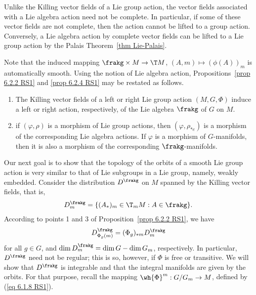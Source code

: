 Unlike the Killing vector fields of a Lie group action, the vector fields associated with a Lie algebra action need not be complete. In particular, if some of these vector fields are not complete, then the action cannot be lifted to a group action. Conversely, a Lie algebra action by complete vector fields can be lifted to a Lie group action by the Palais Theorem~\ref{thm Lie-Palais}.

Note that the induced mapping $\frakg\times M\to \T M$, $(A,m)\mapsto (\phi(A))_m$ is automatically smooth. Using the notion of Lie algebra action, Propositions~\ref{prop 6.2.2 RS1} and \ref{prop 6.2.4 RS1} may be restated as follows.

\begin{cor}[{{\cite[Cor.~6.2.7]{RS1}}}]
    \begin{enumerate}
        \item The Killing vector fields of a left or right Lie group action $(M,G,\Phi)$ induce a left or right action, respectively, of the Lie algebra $\frakg$ of $G$ on $M$.
        \item if $(\varphi,\rho)$ is a morphism of Lie group actions, then $(\varphi,\rho_{\ast e})$ is a morphism of the corresponding Lie algebra actions. If $\varphi$ is a morphism of $G$-manifolds, then it is also a morphism of the corresponding $\frakg$-manifolds.
    \end{enumerate}
\end{cor}

Our next goal is to show that the topology of the orbits of a smooth Lie group action is very similar to that of Lie subgroups in a Lie group, namely, weakly embedded. Consider the distribution $D^\frakg$ on $M$ spanned by the Killing vector fields, that is,
\[D^\frakg_m=\{(A_\ast)_m\in \T_m M:A\in \frakg\}.\]
According to points 1 and 3 of Proposition~\ref{prop 6.2.2 RS1}, we have
\[D^\frakg_{\Phi_g(m)}=(\Phi_g)_{\ast m}D^\frakg_m\label{eq 6.2.4 RS1}\]
for all $g\in G$, and $\dim D_m^\frakg=\dim G-\dim G_m$, respectively. In particular, $D^\frakg$ need not be regular; this is so, however, if $\Phi$ is free or transitive. We will show that $D^\frakg$ is integrable and that the integral manifolds are given by the orbits. For that purpose, recall the mapping $\wh{\Phi}^m:G\slash G_m\to M$, defined by (\ref{eq 6.1.8 RS1}).

